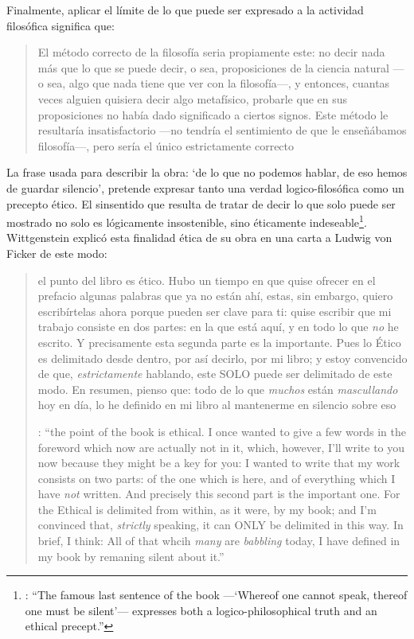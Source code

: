 Finalmente, aplicar el límite de lo que puede ser expresado a la actividad filosófica significa que: \blockquote[{\cite[\S6.53]{wittgenstein1922tractatuses}}]{El método correcto de la filosofía seria propiamente este: no decir nada más que lo que se puede decir, o sea, proposiciones de la ciencia natural ---o sea, algo que nada tiene que ver con la filosofía---, y entonces, cuantas veces alguien quisiera decir algo metafísico, probarle que en sus proposiciones no había dado significado a ciertos signos. Este método le resultaría insatisfactorio ---no tendría el sentimiento de que le enseñábamos filosofía---, pero sería el único estrictamente correcto}. La frase usada para describir la obra: \enquote*{de lo que no podemos hablar, de eso hemos de guardar silencio}, pretende expresar tanto una verdad logico-filosófica como un precepto ético. El sinsentido que resulta de tratar de decir lo que solo puede ser mostrado no solo es lógicamente insostenible, sino éticamente indeseable\footnote{\cite[Cf.~][156]{monk1991duty}: \enquote{The famous last sentence of the book ---`Whereof one cannot speak, thereof one must be silent'--- expresses both a logico-philosophical truth and an ethical precept.}}. Wittgenstein explicó esta finalidad ética de su obra en una carta a Ludwig von Ficker de este modo:
\blockquote[{\cite[22-23]{monk2005howto}}: \enquote{the point of the book is ethical. I once wanted to give a few words in the foreword which now are actually not in it, which, however, I'll write to you now because they might be a key for you: I wanted to write that my work consists on two parts: of the one which is here, and of everything which I have \emph{not} written. And precisely this second part is the important one. For the Ethical is delimited from within, as it were, by my book; and I'm convinced that, \emph{strictly} speaking, it can ONLY be delimited in this way. In brief, I think: All of that whcih \emph{many} are \emph{babbling} today, I have defined in my book by remaning silent about it.}]{el punto del libro es ético. Hubo un tiempo en que quise ofrecer en el prefacio algunas palabras que ya no están ahí, estas, sin embargo, quiero escribírtelas ahora porque pueden ser clave para ti: quise escribir que mi trabajo consiste en dos partes: en la que está aquí, y en todo lo que \emph{no} he escrito. Y precisamente esta segunda parte es la importante. Pues lo Ético es delimitado desde dentro, por así decirlo, por mi libro; y estoy convencido de que, \emph{estrictamente} hablando, este SOLO puede ser delimitado de este modo. En resumen, pienso que: todo de lo que \emph{muchos} están \emph{mascullando} hoy en día, lo he definido en mi libro al mantenerme en silencio sobre eso}.

